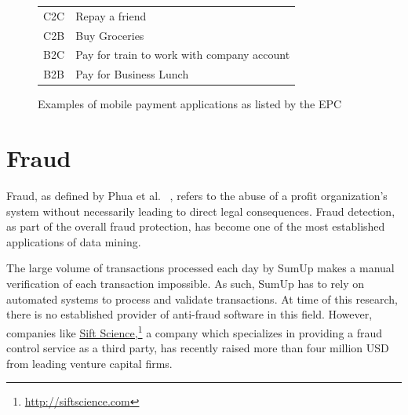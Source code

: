 \documentclass[a4paper, oneside]{csthesis}
\newcommand\fnurl[2]{%
  \href{#2}{#1}\footnote{\url{#2}}%
}
\begin{document}
\begin{figure}
        \centering
        \begin{tabular}{c|l}
        \hline
C2C & Repay a friend \\ \hdashline[0.5pt/3pt]
C2B & Buy Groceries \\ \hdashline[0.5pt/3pt]
B2C & Pay for train to work with company account \\ \hdashline[0.5pt/3pt]
B2B & Pay for Business Lunch \\ \hline
        \end{tabular}
        \caption{Examples of mobile payment applications as listed by the EPC}\label{fig:mp-applications}
\end{figure}




\section{Fraud}

Fraud, as defined by Phua et al. ~\cite{5522816}, refers to the abuse of a profit organization's system without necessarily leading to direct legal consequences. Fraud detection, as part of the overall fraud protection, has become one of the most established applications of data mining.

The large volume of transactions processed each day by SumUp makes a manual verification of each transaction impossible. As such, SumUp has to rely on automated systems to process and validate transactions. At time of this research, there is no established provider of anti-fraud software in this field. However, companies like \fnurl{Sift Science,}{http://siftscience.com} a company which specializes in providing a fraud control service as a third party, has recently raised more than four million USD from leading venture capital firms.
\end{document}
